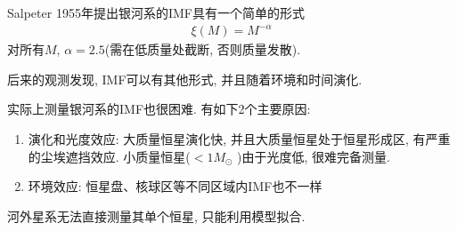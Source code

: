 Salpeter 1955年提出银河系的IMF具有一个简单的形式
\begin{align*}
    \xi(M)=M^{-\alpha}
\end{align*}
对所有$M$, $\alpha=2.5$(需在低质量处截断, 否则质量发散). 

后来的观测发现, IMF可以有其他形式, 并且随着环境和时间演化. 

实际上测量银河系的IMF也很困难. 有如下2个主要原因: 
\begin{enumerate}\small
    \item 演化和光度效应: 大质量恒星演化快, 并且大质量恒星处于恒星形成区, 有严重的尘埃遮挡效应. 小质量恒星($<1M_{\odot}$ )由于光度低, 很难完备测量. 
    \item 环境效应: 恒星盘、核球区等不同区域内IMF也不一样
\end{enumerate}
河外星系无法直接测量其单个恒星, 只能利用模型拟合. 